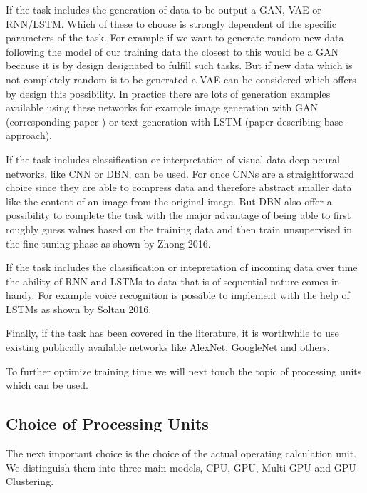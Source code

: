 \documentclass[conference]{IEEEtran}
\begin{document}
If the task includes the generation of data to be output a GAN, VAE or RNN/LSTM. Which of these to choose is strongly dependent of the specific parameters of the task. For example if we want to generate random new data following the model of our training data the closest to this would be a GAN because it is by design designated to fulfill such tasks. But if new data which is not completely random is to be generated a VAE can be considered which offers by design this possibility. In practice there are lots of generation examples available using these networks for example image generation with GAN\cite{junyanz2017} (corresponding paper \cite{zhu2016generative}) or text generation with LSTM\cite{gittesttensorflow} (paper describing base approach\cite{sutskever2011generating}).

If the task includes classification or interpretation of visual data deep neural networks, like CNN or DBN, can be used. For once CNNs are a straightforward choice since they are able to compress data and therefore abstract smaller data like the content of an image from the original image. But DBN also offer a possibility to complete the task with the major advantage of being able to first roughly guess values based on the training data and then train unsupervised in the fine-tuning phase as shown by Zhong 2016\cite{zhong2016diversified}.

If the task includes the classification or intepretation of incoming data over time the ability of RNN and LSTMs to data that is of sequential nature comes in handy. For example voice recognition is possible to implement with the help of LSTMs as shown by Soltau 2016\cite{soltau2016neural}.

Finally, if the task has been covered in the literature, it is worthwhile to use existing publically available networks like AlexNet, GoogleNet and others.

To further optimize training time we will next touch the topic of processing units which can be used.





\subsection{Choice of Processing Units}
The next important choice is the choice of the actual operating calculation unit. We distinguish them into three main models, CPU, GPU, Multi-GPU and GPU-Clustering.
\end{document}
